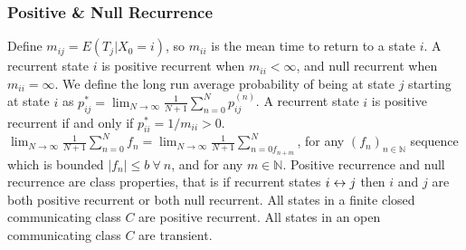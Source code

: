\subsubsection*{Positive \& Null Recurrence}
 Define $m_{ij} = E(T_j|X_0 = i)$, so $m_{ii}$ is the mean time to return to a state $i$. A recurrent state $i$ is positive recurrent when $m_{ii} < \infty$, and null recurrent when $m_{ii} = \infty$.
 We define the long run average probability of being at state $j$ starting at state $i$ as $p^*_{ij} = \lim_{N \to \infty} \frac{1}{N+1}\sum^N_{n=0} p^{(n)}_{ij}$.
 A recurrent state $i$ is positive recurrent if and only if $p^{*}_{ii} = 1/m_{ii} > 0$.
 $\lim_{N \to \infty} \frac{1}{N+1}\sum^N_{n=0} f_n =  \lim_{N \to \infty} \frac{1}{N+1}\sum^N_{n=0 f_{n+m}}$, for any $(f_n)_{n \in \mathbb{N}}$ sequence which is bounded $|f_n| \le b\ \forall\ n$, and for any $m \in \mathbb{N}$.
 Positive recurrence and null recurrence are class properties, that is if recurrent states $i \leftrightarrow j$ then $i$ and $j$ are both positive recurrent or both null recurrent.
 All states in a finite closed communicating class $C$ are positive recurrent.
 All states in an open communicating class $C$ are transient.